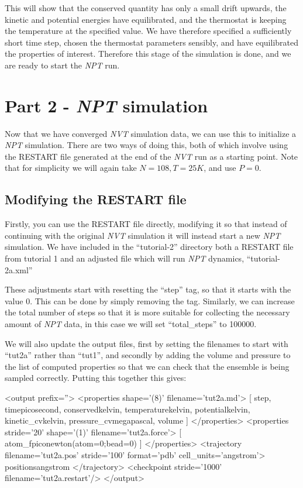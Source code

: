 \documentclass[11pt,english,fleqn]{report}
\newenvironment{code}{%
\footnotesize
\verbatim
}{
\endverbatim
\normalsize
}
\begin{document}
This will show that the conserved quantity has only a small drift upwards,
the kinetic and potential energies have equilibrated, and the thermostat
is keeping the temperature at the specified value.
We have therefore specified a sufficiently short time step, chosen the
thermostat parameters sensibly, and have equilibrated the properties
of interest.
Therefore this stage of the simulation is done, and we are ready
to start the \emph{NPT} run.

\section{Part 2 - \emph{NPT} simulation}

\label{part2}

Now that we have converged \emph{NVT} simulation data, we can use this to
initialize a \emph{NPT} simulation.
There are two ways of doing this,
both of which involve using the RESTART file generated at
the end of the \emph{NVT} run as a starting point.
Note that for simplicity we will again take \(N=108, T=25 K\), and use
\(P=0\).

\subsection{Modifying the RESTART file}

Firstly, you can use the RESTART file directly, modifying it
so that instead of continuing with the original \emph{NVT} simulation
it will instead start a new \emph{NPT} simulation. We have included
in the {}``tutorial-2'' directory both a RESTART file from
tutorial 1 and an adjusted file which will run \emph{NPT} dynamics,
{}``tutorial-2a.xml''

These adjustments start with resetting the {}``step'' tag, so that
it starts with the value 0. This can be done by simply removing the
tag. Similarly, we can increase the total number of
steps so that it is more suitable for collecting the necessary
amount of {\em NPT} data, in this case we will set
{}``total\_steps'' to 100000.

We will also update the output files, first by setting the filenames
to start with {}``tut2a'' rather than {}``tut1'', and secondly by adding
the volume and pressure to the list of computed properties so that
we can check that the ensemble is being sampled correctly.
Putting this together this gives:

\begin{code}
<output prefix=''>
   <properties shape='(8)' filename='tut2a.md'>
      [ step, time{picosecond}, conserved{kelvin},
        temperature{kelvin}, potential{kelvin}, kinetic_cv{kelvin},
        pressure_cv{megapascal}, volume ]
   </properties>
   <properties stride='20' shape='(1)' filename='tut2a.force'>
      [ atom_f{piconewton}(atom=0;bead=0) ]
   </properties>
   <trajectory filename='tut2a.pos' stride='100' format='pdb' cell_units='angstrom'>
      positions{angstrom}
   </trajectory>
   <checkpoint stride='1000' filename='tut2a.restart'/>
</output>
\end{code}
\end{document}
